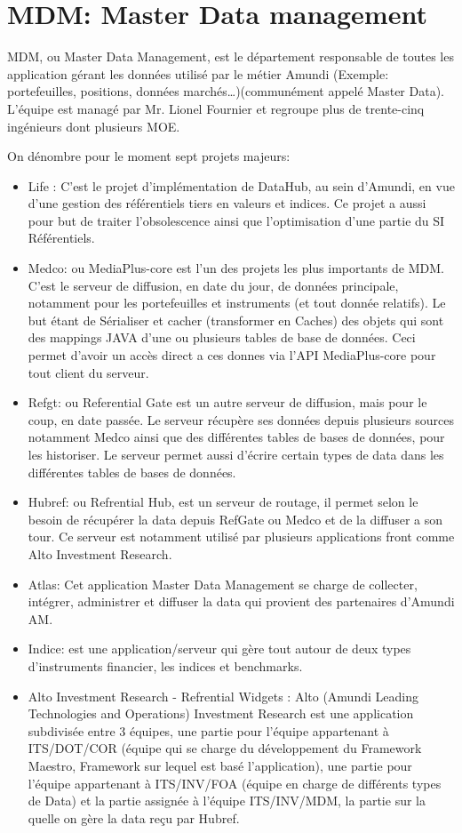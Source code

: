 \section{MDM: Master Data management}
\par MDM, ou Master Data Management, est le département responsable de toutes les application gérant les données utilisé par le métier Amundi (Exemple: portefeuilles, positions, données marchés\dots)(communément appelé Master Data). L'équipe est managé par Mr. Lionel Fournier et regroupe plus de trente-cinq ingénieurs dont plusieurs MOE.
\par On dénombre pour le moment sept projets majeurs:
\begin{itemize}
    \item Life : C'est le projet d'implémentation de DataHub, au sein d'Amundi, en vue d'une gestion des référentiels tiers en valeurs et indices. Ce projet a aussi pour but de traiter l’obsolescence ainsi que l'optimisation d’une partie du SI Référentiels.
    \item Medco: ou MediaPlus-core est l'un des projets les plus importants de MDM. C'est le serveur de diffusion, en date du jour, de données principale, notamment pour les portefeuilles et instruments (et tout donnée relatifs). Le but étant de Sérialiser et cacher (transformer en Caches) des objets qui sont des mappings JAVA d'une ou plusieurs tables de base de données. Ceci permet d'avoir un accès direct a ces donnes via l'API MediaPlus-core pour tout client du serveur.
    \item Refgt: ou Referential Gate est un autre serveur de diffusion, mais pour le coup, en date passée. Le serveur récupère ses données depuis plusieurs sources notamment Medco ainsi que des différentes tables de bases de données, pour les historiser. Le serveur permet aussi d'écrire certain types de data dans les différentes tables de bases de données. 
    \item Hubref: ou Refrential Hub, est un serveur de routage, il permet selon le besoin de récupérer la data depuis RefGate ou Medco et de la diffuser a son tour. Ce serveur est notamment utilisé par plusieurs applications front comme Alto Investment Research.
    \item Atlas: Cet application Master Data Management se charge de collecter, intégrer, administrer et diffuser la data qui provient des partenaires d'Amundi AM.
    \item Indice: est une application/serveur qui gère tout autour de deux types d'instruments financier, les indices et benchmarks. 
    \item Alto Investment Research - Refrential Widgets : Alto (Amundi Leading Technologies and Operations) Investment Research est une application subdivisée entre 3 équipes, une partie pour l'équipe appartenant à ITS/DOT/COR (équipe qui se charge du développement du Framework Maestro, Framework sur lequel est basé l'application), une partie pour l'équipe appartenant à ITS/INV/FOA (équipe en charge de différents types de Data) et la partie assignée à l'équipe ITS/INV/MDM, la partie sur la quelle on gère la data reçu par Hubref.
\end{itemize}

